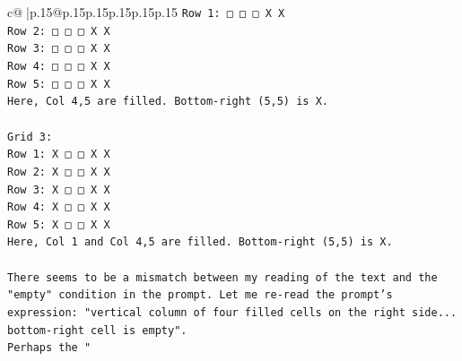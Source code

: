 \documentclass{article}
\begin{document}
{\begin{supertabular}{c@{$\;$}|p{.15\linewidth}@{}p{.15\linewidth}p{.15\linewidth}p{.15\linewidth}p{.15\linewidth}p{.15\linewidth}}
{{{\texttt{Row 1: □ □ □ X X} \\
\texttt{Row 2: □ □ □ X X} \\
\texttt{Row 3: □ □ □ X X} \\
\texttt{Row 4: □ □ □ X X} \\
\texttt{Row 5: □ □ □ X X} \\
\texttt{Here, Col 4,5 are filled. Bottom{-}right (5,5) is X.} \\
\\ 
\texttt{Grid 3:} \\
\texttt{Row 1: X □ □ X X} \\
\texttt{Row 2: X □ □ X X} \\
\texttt{Row 3: X □ □ X X} \\
\texttt{Row 4: X □ □ X X} \\
\texttt{Row 5: X □ □ X X} \\
\texttt{Here, Col 1 and Col 4,5 are filled. Bottom{-}right (5,5) is X.} \\
\\ 
\texttt{There seems to be a mismatch between my reading of the text and the "empty" condition in the prompt. Let me re{-}read the prompt's expression: "vertical column of four filled cells on the right side... bottom{-}right cell is empty".} \\
\texttt{Perhaps the "} \\
            }
        }
    }
     \\ \\

\end{supertabular}
}
\end{document}
